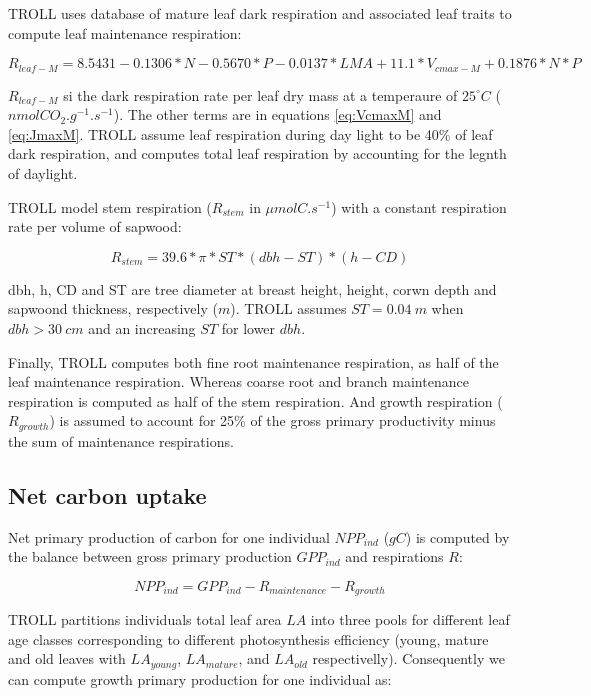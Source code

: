 \documentclass[12pt,]{article}
\theoremstyle{definition}
\theoremstyle{definition}
\theoremstyle{remark}
\begin{document}
TROLL uses \citet{Atkin2015} database of mature leaf dark respiration
and associated leaf traits to compute leaf maintenance respiration:

\begin{equation}
  R_{leaf-M} = 8.5431-0.1306*N-0.5670*P-0.0137*LMA+11.1*V_{cmax-M}+0.1876*N*P
  \label{eq:Rl}
\end{equation}

\(R_{leaf-M}\) si the dark respiration rate per leaf dry mass at a
temperaure of \(25^\circ C\) (\(nmolCO_2.g^{-1}.s^{-1}\)). The other
terms are in equations \eqref{eq:VcmaxM} and \eqref{eq:JmaxM}. TROLL assume
leaf respiration during day light to be 40\% of leaf dark respiration,
and computes total leaf respiration by accounting for the legnth of
daylight.

TROLL model stem respiration (\(R_{stem}\) in \(\mu molC.s^{-1}\)) with
a constant respiration rate per volume of sapwood:

\begin{equation}
  R_{stem} = 39.6*\pi*ST*(dbh-ST)*(h-CD)
  \label{eq:Rs}
\end{equation}

dbh, h, CD and ST are tree diameter at breast height, height, corwn
depth and sapwoond thickness, respectively (\(m\)). TROLL assumes
\(ST=0.04~m\) when \(dbh>30~cm\) and an increasing \(ST\) for lower
\(dbh\).

Finally, TROLL computes both fine root maintenance respiration, as half
of the leaf maintenance respiration. Whereas coarse root and branch
maintenance respiration is computed as half of the stem respiration. And
growth respiration (\(R_{growth}\)) is assumed to account for 25\% of
the gross primary productivity minus the sum of maintenance
respirations.

\subsection{Net carbon uptake}\label{net-carbon-uptake}

Net primary production of carbon for one individual \(NPP_{ind}\)
(\(gC\)) is computed by the balance between gross primary production
\(GPP_{ind}\) and respirations \(R\):

\begin{equation}
  NPP_{ind} = GPP_{ind} - R_{maintenance} - R_{growth}
  \label{eq:NPP}
\end{equation}

TROLL partitions individuals total leaf area \(LA\) into three pools for
different leaf age classes corresponding to different photosynthesis
efficiency (young, mature and old leaves with \(LA_{young}\),
\(LA_{mature}\), and \(LA_{old}\) respectivelly). Consequently we can
compute growth primary production for one individual as:
\end{document}
